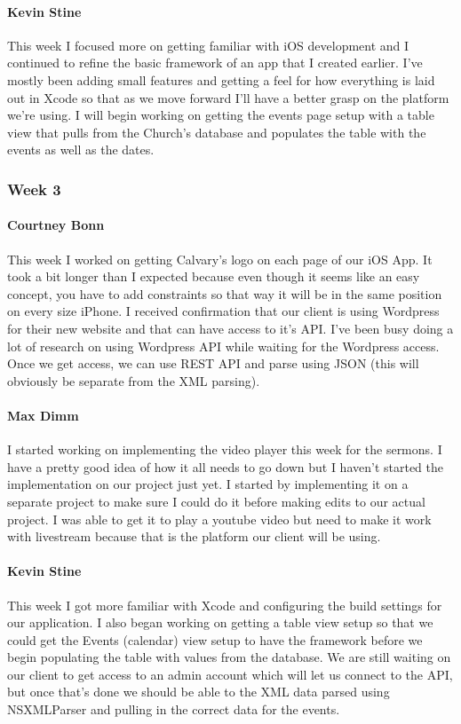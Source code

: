 			\paragraph{Kevin Stine}
			This week I focused more on getting familiar with iOS development and I continued to refine the basic framework of an app that I created earlier. I've mostly been adding small features and getting a feel for how everything is laid out in Xcode so that as we move forward I'll have a better grasp on the platform we're using. I will begin working on getting the events page setup with a table view that pulls from the Church's database and populates the table with the events as well as the dates.

		
		\subsubsection{Week 3}
		
			\paragraph{Courtney Bonn}
			This week I worked on getting Calvary's logo on each page of our iOS App. It took a bit longer than I expected because even though it seems like an easy concept, you have to add constraints so that way it will be in the same position on every size iPhone. I received confirmation that our client is using Wordpress for their new website and that can have access to it's API. I've been busy doing a lot of research on using Wordpress API while waiting for the Wordpress access. Once we get access, we can use REST API and parse using JSON (this will obviously be separate from the XML parsing).

			\paragraph{Max Dimm}
			I started working on implementing the video player this week for the sermons. I have a pretty good idea of how it all needs to go down but I haven't started the implementation on our project just yet. I started by implementing it on a separate project to make sure I could do it before making edits to our actual project. I was able to get it to play a youtube video but need to make it work with livestream because that is the platform our client will be using.
			
			\paragraph{Kevin Stine}
			This week I got more familiar with Xcode and configuring the build settings for our application. I also began working on getting a table view setup so that we could get the Events (calendar) view setup to have the framework before we begin populating the table with values from the database. We are still waiting on our client to get access to an admin account which will let us connect to the API, but once that's done we should be able to the XML data parsed using NSXMLParser and pulling in the correct data for the events.

